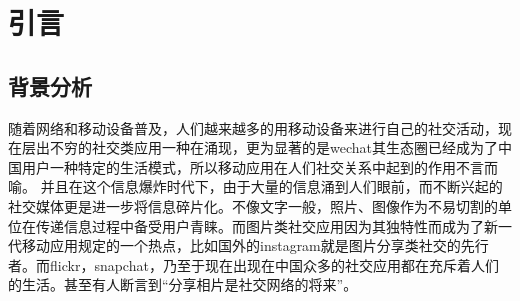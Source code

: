 
\chapter{引言}
\section{背景分析}
随着网络和移动设备普及，人们越来越多的用移动设备来进行自己的社交活动，现在层出不穷的社交类应用一种在涌现，更为显著的是wechat其生态圈已经成为了中国用户一种特定的生活模式，所以移动应用在人们社交关系中起到的作用不言而喻。
并且在这个信息爆炸时代下，由于大量的信息涌到人们眼前，而不断兴起的社交媒体更是进一步将信息碎片化。不像文字一般，照片、图像作为不易切割的单位在传递信息过程中备受用户青睐。而图片类社交应用因为其独特性而成为了新一代移动应用规定的一个热点，比如国外的instagram就是图片分享类社交的先行者。而flickr，snapchat，乃至于现在出现在中国众多的社交应用都在充斥着人们的生活。甚至有人断言到“分享相片是社交网络的将来”。






